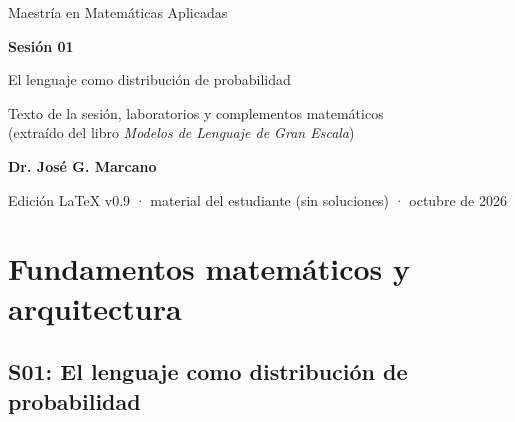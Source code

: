 \documentclass[11pt,a4paper,oneside,openany]{book}
\numberwithin{equation}{section}
\numberwithin{figure}{section}
\numberwithin{table}{section}
\numberwithin{proposicion}{section}
\begin{document}
\frontmatter
\begin{titlepage}\centering\vspace*{3cm}
{\Large\color{gris} Maestría en Matemáticas Aplicadas\par}\vspace{1.0cm}
{\Huge\bfseries\color{azul} Sesión 01\par}\vspace{0.6cm}
{\LARGE El lenguaje como distribución de probabilidad\par}\vspace{1.0cm}
{\large Texto de la sesión, laboratorios y complementos matemáticos\\
(extraído del libro \emph{Modelos de Lenguaje de Gran Escala})\par}\vfill
{\Large\bfseries Dr. José G. Marcano\par}\vspace{2cm}
{\color{gris} Edición LaTeX v0.9 · material del estudiante (sin soluciones) · octubre de 2026\par}
\end{titlepage}
\tableofcontents
\mainmatter
\chapter{Fundamentos matemáticos y arquitectura}\label{c1:cap:01}
\section{S01: El lenguaje como distribución de probabilidad}\label{sec:s01}

\backmatter
\renewcommand{\bibname}{Bibliografía}

\end{document}
